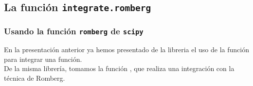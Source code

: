 
\subsection{La función \texttt{integrate.romberg}}
\begin{frame}
\frametitle{Usando la función \texttt{romberg} de \texttt{scipy}}
En la presentación anterior ya hemos presentado de la libreria  el uso de la función  para integrar una función.
\\
\medskip
De la misma librería, tomamos la función , que realiza una integración con la técnica de Romberg.
\end{frame}

